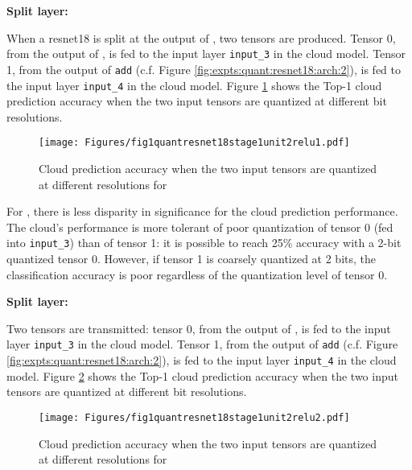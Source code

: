 \textbf{Split layer:} \soneunittworeluone

When a \gls{resnet18} is split at the output of \soneunittworeluone, two tensors are produced. Tensor 0, from the output of \soneunittworeluone, is fed to the input layer \verb|input_3| in the cloud model. Tensor 1, from the output of \verb|add| (c.f. Figure \ref{fig:expts:quant:resnet18:arch:2}), is fed to the input layer \verb|input_4| in the cloud model. Figure \ref{fig:expt:quant:s1u2r1} shows the Top-1 cloud prediction accuracy when the two input tensors are quantized at different bit resolutions.

\begin{figure}[H]
	\centering 
	\texttt{[image: Figures/fig1quantresnet18stage1unit2relu1.pdf]}
	\caption[Prediction accuracy for stage 1 unit 2 relu 1 quantization experiment]{Cloud prediction accuracy when the two input tensors are quantized at different resolutions for \soneunittworeluone}
	\label{fig:expt:quant:s1u2r1}
\end{figure}

For \soneunittworeluone, there is less disparity in significance for the cloud prediction performance. The cloud's performance is more tolerant of poor quantization of tensor 0 (fed into \verb|input_3|) than of tensor 1: it is possible to reach 25\% accuracy with a 2-bit quantized tensor 0. However, if tensor 1 is coarsely quantized at 2 bits, the classification accuracy is poor regardless of the quantization level of tensor 0.

\textbf{Split layer:} \soneunittworelutwo

Two tensors are transmitted: tensor 0, from the output of \soneunittworelutwo, is fed to the input layer \verb|input_3| in the cloud model. Tensor 1, from the output of \verb|add| (c.f. Figure \ref{fig:expts:quant:resnet18:arch:2}), is fed to the input layer \verb|input_4| in the cloud model. Figure \ref{fig:expt:quant:s1u2r2:pred} shows the Top-1 cloud prediction accuracy when the two input tensors are quantized at different bit resolutions.

\begin{figure}[H]
	\centering 
	\texttt{[image: Figures/fig1quantresnet18stage1unit2relu2.pdf]}
	\caption[Prediction accuracy for stage1 unit2 relu2 quantization experiment]{Cloud prediction accuracy when the two input tensors are quantized at different resolutions for \soneunittworelutwo}
	\label{fig:expt:quant:s1u2r2:pred}
\end{figure}


